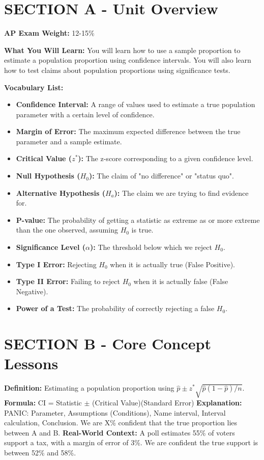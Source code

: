 \section{SECTION A - Unit Overview}
\textbf{AP Exam Weight:} 12-15\%

\textbf{What You Will Learn:} You will learn how to use a sample proportion to estimate a population proportion using confidence intervals. You will also learn how to test claims about population proportions using significance tests.

\textbf{Vocabulary List:}
\begin{itemize}
    \item \textbf{Confidence Interval:} A range of values used to estimate a true population parameter with a certain level of confidence.
    \item \textbf{Margin of Error:} The maximum expected difference between the true parameter and a sample estimate.
    \item \textbf{Critical Value ($z^*$):} The z-score corresponding to a given confidence level.
    \item \textbf{Null Hypothesis ($H_0$):} The claim of "no difference" or "status quo".
    \item \textbf{Alternative Hypothesis ($H_a$):} The claim we are trying to find evidence for.
    \item \textbf{P-value:} The probability of getting a statistic as extreme as or more extreme than the one observed, assuming $H_0$ is true.
    \item \textbf{Significance Level ($\alpha$):} The threshold below which we reject $H_0$.
    \item \textbf{Type I Error:} Rejecting $H_0$ when it is actually true (False Positive).
    \item \textbf{Type II Error:} Failing to reject $H_0$ when it is actually false (False Negative).
    \item \textbf{Power of a Test:} The probability of correctly rejecting a false $H_0$.
\end{itemize}

\section{SECTION B - Core Concept Lessons}

\begin{lessonbox}
\textbf{Definition:} Estimating a population proportion using $\hat{p} \pm z^* \sqrt{\hat{p}(1-\hat{p})/n}$.
\textbf{Formula:} CI = Statistic $\pm$ (Critical Value)(Standard Error)
\textbf{Explanation:} PANIC: Parameter, Assumptions (Conditions), Name interval, Interval calculation, Conclusion. We are X\% confident that the true proportion lies between A and B.
\textbf{Real-World Context:} A poll estimates 55\% of voters support a tax, with a margin of error of 3\%. We are confident the true support is between 52\% and 58\%.
\end{lessonbox}

